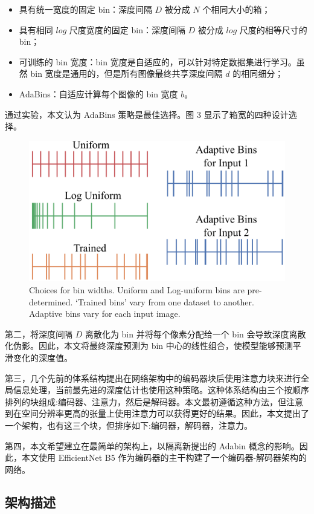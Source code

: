 \documentclass{vip-theme}
\begin{document}
 \begin{itemize}
 	\item 具有统一宽度的固定 bin：深度间隔 $D$ 被分成 $N$ 个相同大小的箱；
	\item 具有相同 $log$ 尺度宽度的固定 bin：深度间隔 $D$ 被分成 $log$ 尺度的相等尺寸的 bin；
	\item 可训练的 bin 宽度：bin 宽度是自适应的，可以针对特定数据集进行学习。虽然 bin 宽度是通用的，但是所有图像最终共享深度间隔 $d$ 的相同细分；
	\item AdaBins：自适应计算每个图像的 bin 宽度 $b$。
 \end{itemize}
 
通过实验，本文认为 AdaBins 策略是最佳选择。图 3 显示了箱宽的四种设计选择。

\begin{figure}[!htbp]
\centering
   \includegraphics[width=0.7\linewidth]{./figure/bin-types-v2}
   \caption{Choices for bin widths. Uniform and Log-uniform bins are pre-determined. `Trained bins' vary from one dataset to another. Adaptive bins vary for each input image.}
\label{fig:binchoices}
\end{figure}

     第二，将深度间隔 $D$ 离散化为 bin 并将每个像素分配给一个 bin 会导致深度离散化伪影。因此，本文将最终深度预测为 bin 中心的线性组合，使模型能够预测平滑变化的深度值。
     
     第三，几个先前的体系结构提出在网络架构中的编码器块后使用注意力块来进行全局信息处理，当前最先进的深度估计也使用这种策略。这种体系结构由三个按顺序排列的块组成:编码器、注意力，然后是解码器。本文最初遵循这种方法，但注意到在空间分辨率更高的张量上使用注意力可以获得更好的结果。因此，本文提出了一个架构，也有这三个块，但排序如下:编码器，解码器，注意力。
     
    第四，本文希望建立在最简单的架构上，以隔离新提出的 Adabin 概念的影响。因此，本文使用 EfficientNet B5 作为编码器的主干构建了一个编码器-解码器架构的网络。
    
\subsection{架构描述}
\end{document}
